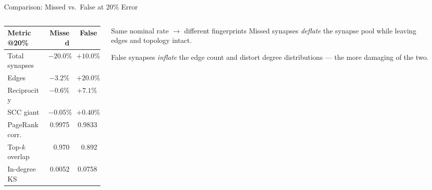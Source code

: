 \documentclass[aspectratio=169,11pt]{beamer}
\begin{document}
\begin{frame}{Comparison: Missed vs.\ False at 20\% Error}
\begin{columns}[c]
  \begin{column}{0.55\textwidth}
    \scriptsize\renewcommand{\arraystretch}{1.5}\setlength{\tabcolsep}{8pt}
    \begin{tabular}{@{}lrr@{}}
      \toprule
      \textbf{Metric @20\%} & \textbf{Missed} & \textbf{False}\\
      \midrule
      Total synapses & $-20.0\%$ & $+10.0\%$\\
      Edges & $-3.2\%$ & $+20.0\%$\\
      Reciprocity & $-0.6\%$ & $+7.1\%$\\
      SCC giant & $-0.05\%$ & $+0.40\%$\\
      PageRank corr. & 0.9975 & 0.9833\\
      Top-$k$ overlap & 0.970 & 0.892\\
      In-degree KS & 0.0052 & 0.0758\\
      \bottomrule
    \end{tabular}
  \end{column}
  \begin{column}{0.43\textwidth}
    \begin{block}{Same nominal rate $\rightarrow$ different fingerprints}
      \footnotesize
      Missed synapses \emph{deflate} the synapse pool while leaving edges
      and topology intact.
    \end{block}
    \begin{block}{}
      \footnotesize
      False synapses \emph{inflate} the edge count and distort degree
      distributions --- the more damaging of the two.
    \end{block}
  \end{column}
\end{columns}
\end{frame}
\end{document}
